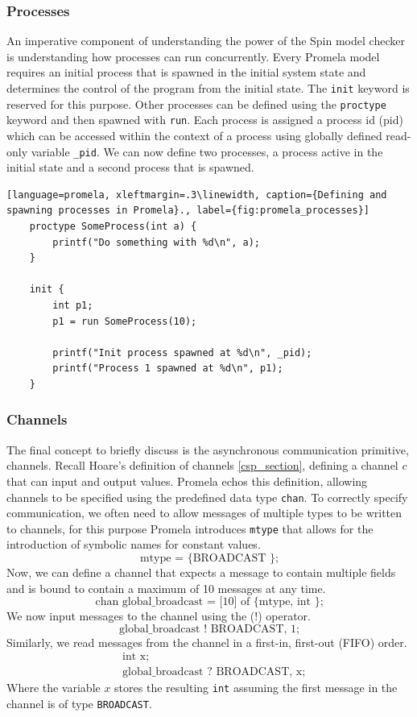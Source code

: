 \subsubsection[]{Processes}
An imperative component of understanding the power of the Spin model checker is understanding how processes can run concurrently. Every Promela model requires an initial process that is spawned in the initial system state and determines the control of the program from the initial state. The \texttt{init} keyword is reserved for this purpose. Other processes can be defined using the \texttt{proctype} keyword and then spawned with \texttt{run}. Each process is assigned a process id (pid) which can be accessed within the context of a process using globally defined read-only variable \texttt{\_pid}. We can now define two processes, a process active in the initial state and a second process that is spawned.
\begin{lstlisting}[language=promela, xleftmargin=.3\linewidth, caption={Defining and spawning processes in Promela}., label={fig:promela_processes}]
    proctype SomeProcess(int a) {
        printf("Do something with %d\n", a);
    }
    
    init {
        int p1;
        p1 = run SomeProcess(10);

        printf("Init process spawned at %d\n", _pid);
        printf("Process 1 spawned at %d\n", p1);
    }
\end{lstlisting}

\subsubsection[]{Channels}
The final concept to briefly discuss is the asynchronous communication primitive, channels. Recall Hoare's definition of channels \ref{csp_section}, defining a channel $c$ that can input and output values. Promela echos this definition, allowing channels to be specified using the predefined data type \texttt{chan}. To correctly specify communication, we often need to allow messages of multiple types to be written to channels, for this purpose Promela introduces \texttt{mtype} that allows for the introduction of symbolic names for constant values.
\[
\text{mtype = \{ BROADCAST \};}
\]
Now, we can define a channel that expects a message to contain multiple fields and is bound to contain a maximum of 10 messages at any time.
\[
\text{chan global\_broadcast = [10] of \{ mtype, int \};}
\]
We now input messages to the channel using the (!) operator.
\[
\text{global\_broadcast ! BROADCAST, 1;}
\]
Similarly, we read messages from the channel in a first-in, first-out (FIFO) order.
\[
\begin{aligned}
& \text{int x;} \\
& \text{global\_broadcast ? BROADCAST, x;}
\end{aligned}
\]
Where the variable $x$ stores the resulting \texttt{int} assuming the first message in the channel is of type \texttt{BROADCAST}.
